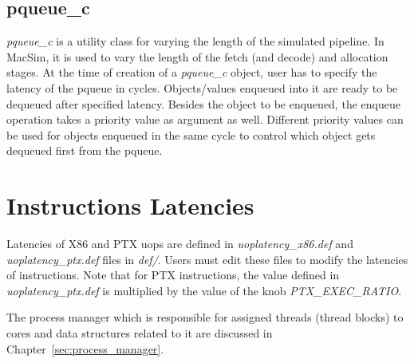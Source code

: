 \subsection{pqueue\_c}

\textit{pqueue\_c} is a utility class for varying the length of the simulated
pipeline. In MacSim, it is used to vary the length of the fetch (and decode)
and allocation stages. At the time of creation of a \textit{pqueue\_c}
object, user has to specify the latency of the pqueue in cycles.
Objects/values enqueued into it are ready to be dequeued after specified
latency. Besides the object to be enqueued, the enqueue operation takes a
priority value as argument as well. Different priority values can be used for
objects enqueued in the same cycle to control which object gets dequeued
first from the pqueue.


\section{Instructions Latencies}

Latencies of X86 and PTX uops are defined in \textit{uoplatency\_x86.def} and
\textit{uoplatency\_ptx.def} files in \textit{def/}. Users must edit these
files to modify the latencies of instructions. Note that for PTX instructions,
the value defined in \textit{uoplatency\_ptx.def} is multiplied by the
value of the knob \textit{PTX\_EXEC\_RATIO}.


The process manager which is responsible for assigned threads (thread blocks)
to cores and data structures related to it are discussed in
Chapter~\ref{sec:process_manager}.

